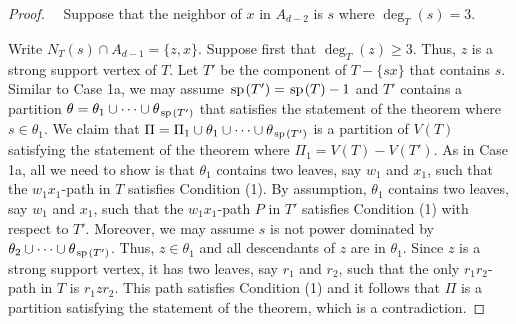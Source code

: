 \documentclass[11pt]{article}
\newcommand{\spider}{\hskip1pt \textrm{sp} \hskip1pt}
\begin{document}
\begin{proof}
\vskip5mm

 \ \ Suppose that the neighbor of $x$ in $A_{d-2}$ is $s$ where $\deg_T(s) = 3$. 

\medskip 
Write $N_T(s) \cap A_{d-1} = \{z, x\}$. Suppose first that $\deg_T(z) \ge3$. Thus, $z$ is a strong support vertex of $T$. Let $T'$ be the component of $T- \{sx\}$ that contains $s$. Similar to Case 1a, we may assume $\spider(T') = \spider(T)-1$ and $T'$ contains a partition $\theta = \theta_1 \cup \cdots \cup \theta_{\spider(T')}$ that satisfies the statement of the theorem where $s \in \theta_1$. We claim that $\Pi = \Pi_1 \cup \theta_1 \cup \cdots \cup \theta_{\spider(T')}$ is a partition of $V(T)$ satisfying the statement of the theorem where $\Pi_1 = V(T) - V(T')$. As in Case 1a, all we need to show is that $\theta_1$ contains two leaves, say $w_1$ and $x_1$, such that the $w_1x_1$-path in $T$ satisfies Condition (1).  By assumption, $\theta_1$ contains two leaves, say $w_1$ and $x_1$, such that the $w_1x_1$-path $P$ in $T'$ satisfies Condition (1) with respect to $T'$. Moreover, we may assume $s$ is not power dominated by $\theta_2 \cup\cdots \cup \theta_{\spider(T')}$. Thus, $z \in \theta_1$ and all descendants of $z$ are in $\theta_1$. Since $z$ is a strong support vertex, it has two leaves, say $r_1$ and $r_2$, such that the only $r_1r_2$-path in $T$ is $r_1zr_2$. This path satisfies Condition (1) and it follows that $\Pi$ is a partition satisfying the statement of the theorem, which is a contradiction.


\end{proof}
\end{document}
